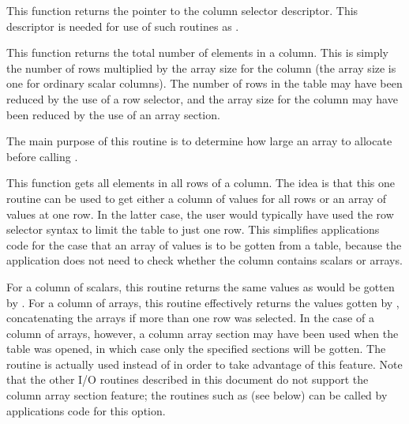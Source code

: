 This function returns the pointer to the column selector descriptor.
This descriptor is needed for use of such routines as .

\callseqfcn

\begin{callseq}
\end{callseq}

This function returns the total number of elements in a column.
This is simply the number of rows multiplied by
the array size for the column
(the array size is one for ordinary scalar columns).
The number of rows in the table may have been reduced
by the use of a row selector,
and the array size for the column may have been reduced
by the use of an array section.

The main purpose of this routine is to
determine how large an array to allocate
before calling .

\callseqfcn

\begin{callseq}
\end{callseq}

This function gets all elements in all rows of a column.
The idea is that this one routine can be used
to get either a column of values for all rows
or an array of values at one row.
In the latter case,
the user would typically have used the row selector syntax
to limit the table to just one row.
This simplifies applications code
for the case that an array of values is to be gotten from a table,
because the application does not need to check
whether the column contains scalars or arrays.

For a column of scalars,
this routine returns the same values as
would be gotten by .
For a column of arrays,
this routine effectively returns the values gotten by ,
concatenating the arrays if more than one row was selected.
In the case of a column of arrays, however,
a column array section may have been used when the table was opened,
in which case only the specified sections will be gotten.
The  routine is actually used
instead of  in order to take advantage of this feature.
Note that the other I/O routines described in this document
do not support the column array section feature;
the  routines such as  (see below)
can be called by applications code for this option.

